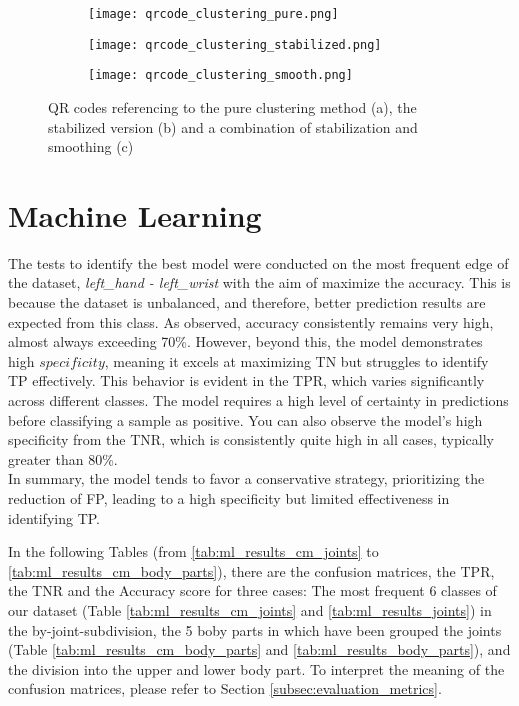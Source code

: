 \begin{figure}[h]
  \centering
  \begin{subfigure}[b]{0.49\textwidth}
    \centering
    \texttt{[image: qrcode\_clustering\_pure.png]}
    \caption{}
    \label{fig:qr_movement_pure}
  \end{subfigure}
  \hfill
  \begin{subfigure}[b]{0.49\textwidth}
    \centering
    \texttt{[image: qrcode\_clustering\_stabilized.png]}
    \caption{}
    \label{fig:qr_movement_stabilized}
  \end{subfigure}
  \hfill
  \begin{subfigure}[b]{0.49\textwidth}
    \centering
    \texttt{[image: qrcode\_clustering\_smooth.png]}
    \caption{}
    \label{fig:qr_movement_smooth}
  \end{subfigure}
  \caption{QR codes referencing to the pure clustering method (a), the stabilized version (b) and a combination of stabilization and smoothing (c)}
  \label{fig:qr_movements}
\end{figure}


\clearpage

\section{Machine Learning}

The tests to identify the best model were conducted on the most frequent edge of the dataset, \textit{left\_hand - left\_wrist} with the aim of maximize the accuracy.
This is because the dataset is unbalanced, and therefore, better prediction results are expected from this class.
As observed, accuracy consistently remains very high, almost always exceeding 70\%.
However, beyond this, the model demonstrates high $specificity$, meaning it excels at maximizing TN but struggles to identify TP effectively.
This behavior is evident in the TPR, which varies significantly across different classes.
The model requires a high level of certainty in predictions before classifying a sample as positive.
You can also observe the model's high specificity from the TNR, which is consistently quite high in all cases, typically greater than 80\%. \\
In summary, the model tends to favor a conservative strategy, prioritizing the reduction of FP, leading to a high specificity but limited effectiveness in identifying TP.

In the following Tables (from \ref{tab:ml_results_cm_joints} to \ref{tab:ml_results_cm_body_parts}), there are the confusion matrices, the TPR, the TNR and the Accuracy score for three cases: 
The most frequent 6 classes of our dataset (Table \ref{tab:ml_results_cm_joints} and \ref{tab:ml_results_joints}) in the by-joint-subdivision, the 5 boby parts in which have been grouped the joints (Table \ref{tab:ml_results_cm_body_parts} and \ref{tab:ml_results_body_parts}), and the division into the upper and lower body part.
To interpret the meaning of the confusion matrices, please refer to Section \ref{subsec:evaluation_metrics}.

